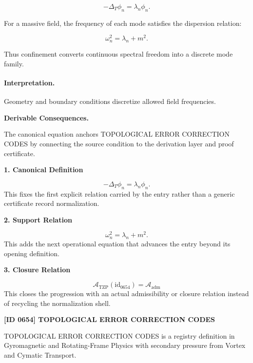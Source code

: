\begin{equation}
-\Delta_T \phi_n = \lambda_n\phi_n .
\end{equation}

For a massive field, the frequency of each mode satisfies the dispersion relation:

\begin{equation}
\omega_n^2=\lambda_n+m^2 .
\end{equation}

Thus confinement converts continuous spectral freedom into a discrete mode family.

\paragraph{Interpretation.}
Geometry and boundary conditions discretize allowed field frequencies.

\par\vspace{0.35em}
\noindent\textbf{Derivable Consequences.}\quad
\begingroup
\footnotesize
\raggedright
The canonical equation anchors TOPOLOGICAL ERROR CORRECTION CODES by connecting the source condition to the derivation layer and proof certificate.
\par\endgroup

\noindent\textbf{1. Canonical Definition}\par
\[
-\Delta_T \phi_n = \lambda_n \phi_n.
\]
\noindent This fixes the first explicit relation carried by the entry rather than a generic certificate record normalization.\par
\noindent\textbf{2. Support Relation}\par
\[
\omega_n^2 = \lambda_n + m^2.
\]
\noindent This adds the next operational equation that advances the entry beyond its opening definition.\par
\noindent\textbf{3. Closure Relation}\par
\[
\mathcal{A}_{\mathrm{TZP}}(\mathrm{id}_{0654})=\mathcal{A}_{\mathrm{adm}}
\]
\noindent This closes the progression with an actual admissibility or closure relation instead of recycling the normalization shell.\par

\clearpage
\noindent\textbf{[ID 0654] TOPOLOGICAL ERROR CORRECTION CODES}\par
\vspace{0.35em}
\begingroup\small
{}
TOPOLOGICAL ERROR CORRECTION CODES is a registry definition in Gyromagnetic and Rotating-Frame Physics with secondary pressure from Vortex and Cymatic Transport.


